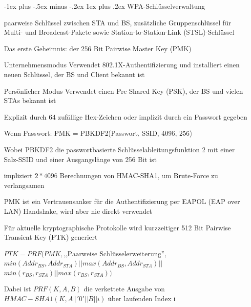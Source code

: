 \documentclass[a4paper]{article}
\makeatletter
\renewcommand{\subsubsection}{\@startsection{subsubsection}{3}{0mm}%
 {-1ex plus -.5ex minus -.2ex}%
 {1ex plus .2ex}%
 {\normalfont\small\bfseries}}
\makeatother
\begin{document}
\begin{multicols}{3}
      \subsubsection{WPA-Schlüsselverwaltung}
      \begin{itemize*}
            \item paarweise Schlüssel zwischen STA und BS, zusätzliche Gruppenschlüssel für Multi- und Broadcast-Pakete sowie Station-to-Station-Link (STSL)-Schlüssel
            \item Das erste Geheimnis: der 256 Bit Pairwise Master Key (PMK)
            \begin{description*}
                  \item[Unternehmensmodus] Verwendet 802.1X-Authentifizierung und installiert einen neuen Schlüssel, der BS und Client bekannt ist%
                  \item[Persönlicher Modus] Verwendet einen Pre-Shared Key (PSK), der BS und vielen STAs bekannt ist
                  \begin{itemize*}
                        \item Explizit durch 64 zufällige Hex-Zeichen oder implizit durch ein Passwort gegeben
                        \item Wenn Passwort: PMK = PBKDF2(Passwort, SSID, 4096, 256)
                        \item Wobei PBKDF2 die passwortbasierte Schlüsselableitungsfunktion 2 mit einer Salz-SSID und einer Ausgangslänge von 256 Bit ist
                        \item impliziert $2*4096$ Berechnungen von HMAC-SHA1, um Brute-Force zu verlangsamen
                  \end{itemize*}
            \end{description*}
            \item PMK ist ein Vertrauensanker für die Authentifizierung per EAPOL (EAP over LAN) Handshake, wird aber nie direkt verwendet
            \item Für aktuelle kryptographische Protokolle wird kurzzeitiger 512 Bit Pairwise Transient Key (PTK) generiert
            \begin{itemize*}
                  \item $PTK = PRF(PMK, \text{,,Paarweise Schlüsselerweiterung''},$ $min(Addr_{BS}, Addr_{STA}) || max(Addr_{BS}, Addr_{STA}) ||$ $min(r_{BS}, r_{STA}) || max(r_{BS}, r_{STA}))$
                  \item Dabei ist $PRF(K,A,B)$ die verkettete Ausgabe von $HMAC-SHA1(K, A || '0' || B || i)$ über laufenden Index i

\end{itemize*}
\end{itemize*}
\end{multicols}
\end{document}
